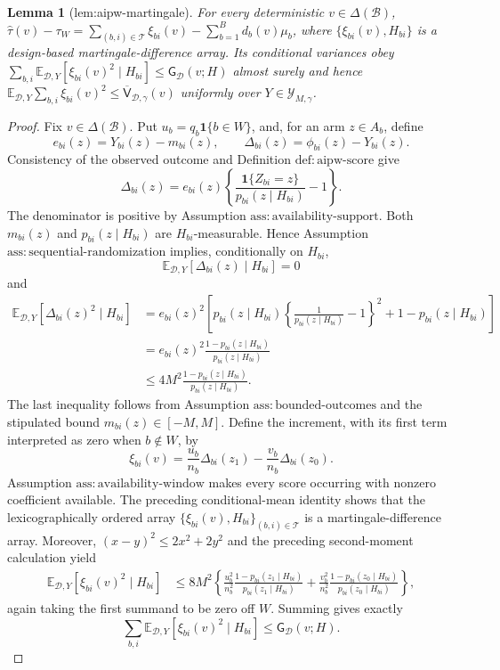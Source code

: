\documentclass{article}
\newtheorem{lemma}{Lemma}
\begin{document}
\begin{lemma}[lem:aipw-martingale]\label{lem:aipw-martingale}
For every deterministic \(v\in\Delta(\mathcal B)\), \(\widehat\tau(v)-\tau_W=\sum_{(b,i)\in\mathcal T}\xi_{bi}(v)-\sum_{b=1}^B d_b(v)\mu_b\), where \(\{\xi_{bi}(v),H_{bi}\}\) is a design-based martingale-difference array. Its conditional variances obey \(\sum_{b,i}\mathbb E_{\mathcal D,Y}[\xi_{bi}(v)^2\mid H_{bi}]\le\mathsf G_{\mathcal D}(v;H)\) almost surely and hence \(\mathbb E_{\mathcal D,Y}\sum_{b,i}\xi_{bi}(v)^2\le\overline{\mathsf V}_{\mathcal D,\gamma}(v)\) uniformly over \(Y\in\mathcal Y_{M,\gamma}\).
\end{lemma}
\begin{proof}
Fix \(v\in\Delta(\mathcal B)\).  Put \(u_b=q_b\mathbf 1\{b\in W\}\), and, for an arm \(z\in A_b\), define
\[
e_{bi}(z)=Y_{bi}(z)-m_{bi}(z),
\qquad
\Delta_{bi}(z)=\phi_{bi}(z)-Y_{bi}(z).
\]
Consistency of the observed outcome and Definition \(\mathrm{def:aipw\text{-}score}\) give
\[
\Delta_{bi}(z)
=e_{bi}(z)\left\{\frac{\mathbf 1\{Z_{bi}=z\}}
 {p_{bi}(z\mid H_{bi})}-1\right\}.
\]
The denominator is positive by Assumption \(\mathrm{ass:availability\text{-}support}\).  Both \(m_{bi}(z)\) and \(p_{bi}(z\mid H_{bi})\) are \(H_{bi}\)-measurable.  Hence Assumption \(\mathrm{ass:sequential\text{-}randomization}\) implies, conditionally on \(H_{bi}\),
\[
\mathbb E_{\mathcal D,Y}[\Delta_{bi}(z)\mid H_{bi}]=0
\]
and
\[
\begin{aligned}
\mathbb E_{\mathcal D,Y}[\Delta_{bi}(z)^2\mid H_{bi}]
&=e_{bi}(z)^2\left[
p_{bi}(z\mid H_{bi})
 \left\{\frac1{p_{bi}(z\mid H_{bi})}-1\right\}^{2}
+1-p_{bi}(z\mid H_{bi})\right]\\
&=e_{bi}(z)^2
 \frac{1-p_{bi}(z\mid H_{bi})}{p_{bi}(z\mid H_{bi})}\\
&\le 4M^2
 \frac{1-p_{bi}(z\mid H_{bi})}{p_{bi}(z\mid H_{bi})}.
\end{aligned}
\]
The last inequality follows from Assumption \(\mathrm{ass:bounded\text{-}outcomes}\) and the stipulated bound \(m_{bi}(z)\in[-M,M]\).  Define the increment, with its first term interpreted as zero when \(b\notin W\), by
\[
\xi_{bi}(v)
=\frac{u_b}{n_b}\Delta_{bi}(z_1)
-\frac{v_b}{n_b}\Delta_{bi}(z_0).
\]
Assumption \(\mathrm{ass:availability\text{-}window}\) makes every score occurring with nonzero coefficient available.  The preceding conditional-mean identity shows that the lexicographically ordered array 
\(\{\xi_{bi}(v),H_{bi}\}_{(b,i)\in\mathcal T}\) is a martingale-difference array.  Moreover, \((x-y)^2\le 2x^2+2y^2\) and the preceding second-moment calculation yield
\[
\begin{aligned}
\mathbb E_{\mathcal D,Y}[\xi_{bi}(v)^2\mid H_{bi}]
&\le 8M^2\left\{
\frac{u_b^2}{n_b^2}
\frac{1-p_{bi}(z_1\mid H_{bi})}{p_{bi}(z_1\mid H_{bi})}
+\frac{v_b^2}{n_b^2}
\frac{1-p_{bi}(z_0\mid H_{bi})}{p_{bi}(z_0\mid H_{bi})}
\right\},
\end{aligned}
\]
again taking the first summand to be zero off \(W\).  Summing gives exactly
\[
\sum_{b,i}\mathbb E_{\mathcal D,Y}[\xi_{bi}(v)^2\mid H_{bi}]
\le \mathsf G_{\mathcal D}(v;H).
\]


\end{proof}
\end{document}
